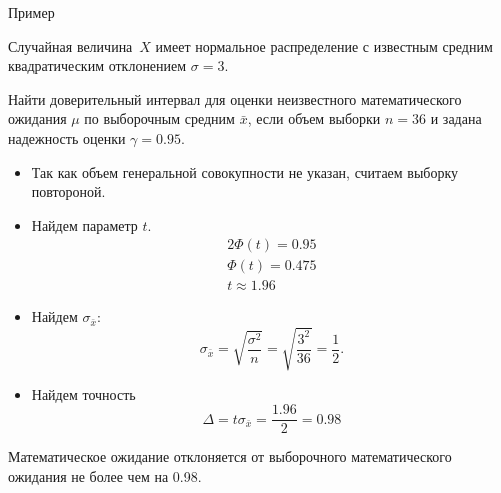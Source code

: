 \documentclass[unicode,11pt,notheorems,xcolor=table]{beamer}
\begin{document}
\begin{frame}[allowframebreaks]{Пример}
    \begin{exampleblock}{}
        Случайная величина~$X$ имеет нормальное распределение с известным средним квадратическим отклонением $\sigma=3$. 

        Найти доверительный интервал для оценки неизвестного математического ожидания $\mu$ по выборочным средним $\bar{x}$, если объем выборки $n = 36$ и задана надежность оценки $\gamma= 0.95$.
    \end{exampleblock}
    \begin{itemize}
        \item Так как объем генеральной совокупности не указан, считаем выборку повтороной.
        \item Найдем параметр $t$. 
        \begin{gather*}
            2\Phi(t) = 0.95\\
            \Phi(t) = 0.475\\
            t \approx 1.96
        \end{gather*}
        \item Найдем $\sigma_{\bar{x}}$:
        $$
            \sigma_{\bar{x}} = \sqrt{\frac{\sigma^2}{n}} 
            = \sqrt{\frac{3^2}{36}} 
            = \frac{1}{2}. 
        $$
        \item Найдем точность 
        $$
            \Delta = t\sigma_{\bar{x}} = \frac{1.96}{2}=0.98
        $$
    \end{itemize}
     Математическое ожидание отклоняется от выборочного математического ожидания не более чем на 0.98.
\end{frame}
\end{document}
